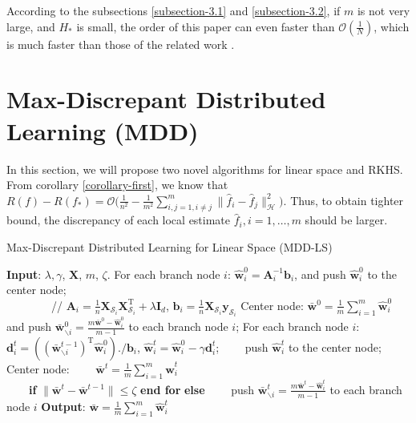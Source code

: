 \documentclass{article}
\begin{document}
According to the subsections \ref{subsection-3.1} and \ref{subsection-3.2},
if $m$ is not very large, and $H_\ast$ is small,
the order of this paper can even faster than $\mathcal{O}\left(\frac{1}{N}\right)$,
which is much faster than those of the related work \cite{zhang2012communication,Zhang2013,lin2017distributed}.

\section{Max-Discrepant Distributed Learning (MDD)}
In this section, we will propose two novel algorithms for linear space and RKHS.
From corollary \ref{corollary-first},  we know that
  $
     R(f)-R(f_\ast)=\mathcal{O}\Big(\frac{1}{n^2}-\frac{1}{m^2}\sum_{i,j=1,i\not=j}^m\|\hat{f}_i-\hat{f}_j\|_\mathcal{H}^2\Big).
$
Thus, to obtain tighter bound, the discrepancy of each local estimate $\hat{f}_i, i=1,\ldots,m$ should be larger.

\begin{algorithm}
    \caption{Max-Discrepant Distributed Learning for Linear Space (MDD-LS)}
    \label{alg:RMMls}
    \begin{algorithmic}[1]
    \STATE \textbf{Input}: $\lambda,\gamma$, $\mathbf X$, $m$, $\zeta$.
     \STATE For each branch node $i$: $\hat{\mathbf w}_i^0=\mathbf A_i^{-1} \mathbf b_i$, and push $\hat{\mathbf w}_i^0$ to the center node;\\
         ~~~~~~~~// $\mathbf A_i=\frac{1}{n}\mathbf X_{\mathcal{S}_i}\mathbf X_{\mathcal{S}_i}^\mathrm{T}+
            \lambda \mathbf I_d$, $\mathbf b_i= \frac{1}{n}\mathbf X_{\mathcal{S}_i}\mathbf y_{\mathcal{S}_i}$
    \STATE Center node: $\bar{\mathbf w}^0=\frac{1}{m}\sum_{i=1}^m\hat{\mathbf w}_i^0$ and
    push $\bar{\mathbf w}^{0}_{\backslash i}=\frac{m\bar{\mathbf w}^{0}-\hat{\mathbf w}_i^0}{m-1}$ to each branch node $i$;
    \STATE  For each branch node $i$:
    \STATE ~~~~$\mathbf d_i^t=\left(\left(\bar{\mathbf w}^{t-1}_{\backslash i}\right)^\mathrm{T}\hat{\mathbf w}_i^{0}\right)./\mathbf b_i$,
     $\hat{\mathbf w}_i^t=\hat{\mathbf w}_i^0-\gamma\mathbf d_i^t$;
    \STATE ~~~~push $\hat{\mathbf w}_i^t$ to the center node;
     \STATE Center node:
     \STATE ~~~~$\bar{\mathbf w}^t=\frac{1}{m}\sum_{i=1}^m\hat{\mathbf w}_i^t$\\
      ~~~~\textbf{if} {$\|\bar{\mathbf w}^{t}-\bar{\mathbf w}^{t-1}\|\leq \zeta$} \textbf{end for}
      \STATE \textbf{else}
      \STATE ~~~~push $\bar{\mathbf w}^{t}_{\backslash i}=\frac{m\bar{\mathbf w}^{t}-\hat{\mathbf w}_i^t}{m-1}$ to each branch node $i$
    \ENDFOR
    \STATE \textbf{Output}: $\bar{\mathbf w}=\frac{1}{m}\sum_{i=1}^m\hat{\mathbf w}_i^t$
    \end{algorithmic}
\end{algorithm}
\end{document}
